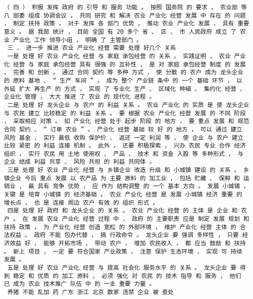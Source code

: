 \documentclass{article}
\begin{document}
\begin{Verbatim}[commandchars=\\\{\}]
 （ 四 ） 积极 发挥 政府 的 引导 和 服务 功能 。 按照 国务院 的 要求 ， 农业部 等 八 部委 组成 协调会议 ， 共同 研究 和 解决 农业 产业化 经营 发展 中 存在 的 问题 ， 制定 扶持 政策 ， 对于 发挥 各 部门 优势 ， 推动 农业 产业化 发展 ， 具有 重要 意义 。 据 我部 统计 ， 目前 全国 有 20 多个 省 、 区 、 市 人民政府 成立 了 农业 产业化 工作 领导小组 ， 明确 了 主管部门 。 
 三 、 进一步 推进 农业 产业化 经营 需要 处理 好几个 关系 
 一是 处理 好 农业 产业化 经营 与 家庭 承包经营 的 关系 。 实践证明 ， 农业 产业化 经营 与 家庭 承包经营 具有 很强 的 互补性 ， 是 对 家庭 承包经营 制度 的 发展 、 完善 和 创新 。 通过 合同 契约 等 多种 方式 ， 使 分散 的 农户 成为 龙头企业 的 原料 基地 、 “ 生产 车间 ” ， 成为 整个 产业链 条中 的 一个 基础 环节 ， 以 外延 扩大 再生产 的 方式 ， 实现 了 专业化 生产 、 区域化 种植 、 集约化 经营 、 企业化 管理 ， 大大 推进 了 农业 的 现代化 进程 。 
 二是 处理 好 龙头企业 与 农户 的 利益 关系 。 农业 产业化 的 实质 是 使 龙头企业 与 农民 建立 比较稳定 的 利益 关系 。 要 根据 农业 产业化 经营 发展 的 不同 阶段 ， 采取相应 对策 。 如 产业化 经营 处于 起步 阶段 的 地方 ， 要 重点 发展 和 规范 合同 契约 、 “ 订单 农业 ” 。 产业化 经营 基础 较 好 的 地方 ， 可以 通过 建立 风险 基金 、 实行 最低 收购 保护价 、 返还 一定 利润 等 ， 使 企业 与 农户 建立 比较 紧密 的 利益 连接 机制 。 此外 ， 还要 积极探索 ， 兴办 农民 专业 合作 经济 组织 ， 实行 农民 用 土地 使用权 、 产品 、 技术 和 资金 入股 等 多种形式 ， 与 企业 结成 利益 共享 、 风险 共担 的 利益 共同体 。 
 三是 处理 好 农业 产业化 经营 与 乡镇企业 改造 升级 和 小城镇 建设 的 关系 。 乡镇企业 今后 重点 发展 以 农产品 为 主要 原料 的 加工业 ， 包括 贮藏 、 保鲜 和 运销业 ， 最 具有 竞争 优势 ， 应 作为 结构调整 的 一个 基本 方向 。 发展 小城镇 ， 关键 是 培育 小城镇 的 经济基础 。 农业 产业化 经营 是 发展 小城镇 经济 重要 的 增长点 ， 也 是 连接 周边 农户 有效 的 组织 形式 。 
 四是 处理 好 政府 和 龙头企业 的 关系 。 农业 产业化 经营 的 主体 是 企业 和 农户 。 在 发展 农业 产业化 经营 过程 中 ， 政府 的 主要职责 应是 制定 发展 规划 和 扶持 政策 ， 为 产业化 经营 创造 宽松 的 外部环境 ， 维护 产业化 经营 主体 的 合法权益 。 政府 不能 包办代替 ， 搞 行政命令 。 龙头企业 要 强调 多样性 ， 只要 经济效益 好 ， 能够 开拓市场 ， 带动 农户 ， 增加 农民收入 ， 都 应当 鼓励 和 扶持 。 新上 项目 ， 一定 要 符合国家 产业政策 ， 注意 保护 生态环境 ， 实现 可 持续 发展 。 
 五是 处理 好 农业 产业化 经营 与 提高 社会化 服务水平 的 关系 。 龙头企业 要 得到 稳定 和 优质 的 加工 原料 ， 必须 强化 对 农民 的 技术 指导 和 服务 ， 他们 已 成为 农业 技术推广 队伍 中 的 一支 重要 力量 。 
 养猪 不能 乱加 药 广东 浙江 北京 数家 违禁 企业 被 查处 

\end{Verbatim}
\end{document}
